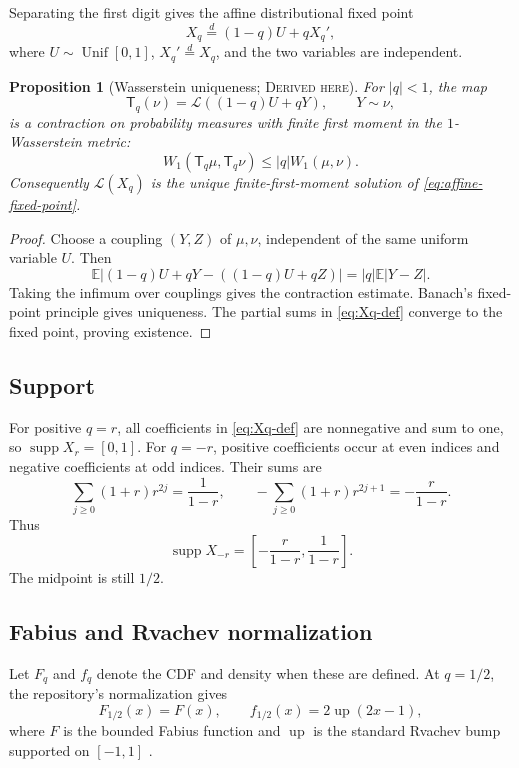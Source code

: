 \documentclass[11pt,oneside]{article}
\newtheorem{proposition}[theorem]{Proposition}
\theoremstyle{definition}
\theoremstyle{remark}
\newcommand{\E}{\mathbb E}
\newcommand{\Law}{\mathcal L}
\newcommand{\Unif}{\operatorname{Unif}}
\newcommand{\supp}{\operatorname{supp}}
\newcommand{\Up}{\operatorname{up}}
\newcommand{\abs}[1]{\left\lvert#1\right\rvert}
\newcommand{\Derived}{\textsc{Derived here}}
\begin{document}
Separating the first digit gives the affine distributional fixed point
\begin{equation}\label{eq:affine-fixed-point}
 X_q\stackrel d=(1-q)U+qX_q',
\end{equation}
where \(U\sim\Unif[0,1]\), \(X_q'\stackrel d=X_q\), and the two variables are
independent.

\begin{proposition}[Wasserstein uniqueness; \Derived]\label{prop:wasserstein}
For \(|q|<1\), the map
\[
 \mathsf T_q(\nu)=\Law((1-q)U+qY),\qquad Y\sim\nu,
\]
is a contraction on probability measures with finite first moment in the
\(1\)-Wasserstein metric:
\[
 W_1(\mathsf T_q\mu,\mathsf T_q\nu)\le |q|W_1(\mu,\nu).
\]
Consequently \(\Law(X_q)\) is the unique finite-first-moment solution of
\eqref{eq:affine-fixed-point}.
\end{proposition}

\begin{proof}
Choose a coupling \((Y,Z)\) of \(\mu,\nu\), independent of the same uniform
variable \(U\).  Then
\[
 \E\abs{(1-q)U+qY-((1-q)U+qZ)}=|q|\E\abs{Y-Z}.
\]
Taking the infimum over couplings gives the contraction estimate.  Banach's
fixed-point principle gives uniqueness.  The partial sums in
\eqref{eq:Xq-def} converge to the fixed point, proving existence.
\end{proof}

\subsection{Support}
For positive \(q=r\), all coefficients in \eqref{eq:Xq-def} are nonnegative
and sum to one, so \(\supp X_r=[0,1]\).  For \(q=-r\), positive coefficients
occur at even indices and negative coefficients at odd indices.  Their sums are
\[
 \sum_{j\ge0}(1+r)r^{2j}=\frac1{1-r},\qquad
 -\sum_{j\ge0}(1+r)r^{2j+1}=-\frac r{1-r}.
\]
Thus
\begin{equation}\label{eq:negative-support}
 \supp X_{-r}=\left[-\frac r{1-r},\frac1{1-r}\right].
\end{equation}
The midpoint is still \(1/2\).

\subsection{Fabius and Rvachev normalization}
Let \(F_q\) and \(f_q\) denote the CDF and density when these are defined.  At
\(q=1/2\), the repository's normalization gives
\begin{equation}\label{eq:fabius-bridge}
 F_{1/2}(x)=F(x),\qquad
 f_{1/2}(x)=2\Up(2x-1),
\end{equation}
where \(F\) is the bounded Fabius function and \(\Up\) is the standard Rvachev
bump supported on \([-1,1]\) \cite{repo-primary,arias-up}.
\end{document}
